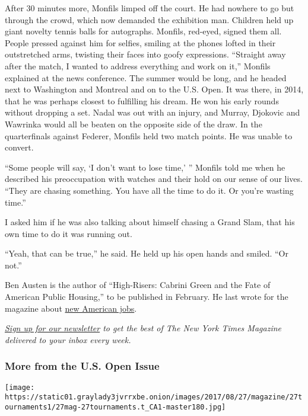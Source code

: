 After 30 minutes more, Monfils limped off the court. He had nowhere to
go but through the crowd, which now demanded the exhibition man.
Children held up giant novelty tennis balls for autographs. Monfils,
red-eyed, signed them all. People pressed against him for selfies,
smiling at the phones lofted in their outstretched arms, twisting their
faces into goofy expressions. ``Straight away after the match, I wanted
to address everything and work on it,'' Monfils explained at the news
conference. The summer would be long, and he headed next to Washington
and Montreal and on to the U.S. Open. It was there, in 2014, that he was
perhaps closest to fulfilling his dream. He won his early rounds without
dropping a set. Nadal was out with an injury, and Murray, Djokovic and
Wawrinka would all be beaten on the opposite side of the draw. In the
quarterfinals against Federer, Monfils held two match points. He was
unable to convert.

``Some people will say, `I don't want to lose time,' '' Monfils told me
when he described his preoccupation with watches and their hold on our
sense of our lives. ``They are chasing something. You have all the time
to do it. Or you're wasting time.''

I asked him if he was also talking about himself chasing a Grand Slam,
that his own time to do it was running out.

``Yeah, that can be true,'' he said. He held up his open hands and
smiled. ``Or not.''

Ben Austen is the author of ``High-Risers: Cabrini Green and the Fate of
American Public Housing,'' to be published in February. He last wrote
for the magazine about
\href{https://www.nytimes3xbfgragh.onion/2017/02/23/magazine/the-new-working-class.html}{new
American jobs}.

\emph{\href{http://www.nytimes3xbfgragh.onion/newsletters/magazine}{Sign
up for our newsletter} to get the best of The New York Times Magazine
delivered to your inbox every week.}

\hypertarget{more-from-the-us-open-issue}{%
\subsubsection{More from the U.S. Open
Issue}\label{more-from-the-us-open-issue}}

\href{https://www.nytimes3xbfgragh.onion/interactive/2017/08/24/magazine/usopen-grand-slam-wimbledon-pleasures-pitfalls.html}{}

\texttt{[image: https://static01.graylady3jvrrxbe.onion/images/2017/08/27/magazine/27tournaments1/27mag-27tournaments.t\_CA1-master180.jpg]}

